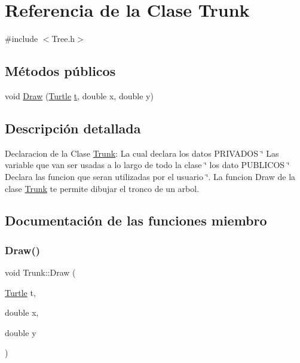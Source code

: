 \hypertarget{class_trunk}{}\section{Referencia de la Clase Trunk}
\label{class_trunk}


{\ttfamily \#include $<$Tree.\+h$>$}

\subsection*{Métodos públicos}
\begin{DoxyCompactItemize}
\item 
void \mbox{\hyperlink{class_trunk_a7317a58c0bce19c86cf9e90b5f0cbd93}{Draw}} (\mbox{\hyperlink{class_turtle}{Turtle}} \mbox{\hyperlink{_abstract_8cpp_a87833ae07d42f160626b6355cd9f8cf0}{t}}, double x, double y)
\end{DoxyCompactItemize}


\subsection{Descripción detallada}
Declaracion de la Clase \mbox{\hyperlink{class_trunk}{Trunk}}\+: La cual declara los datos P\+R\+I\+V\+A\+D\+OS \char`\"{} Las variable que van ser usadas a lo largo de todo la clase \char`\"{} los dato P\+U\+B\+L\+I\+C\+OS \char`\"{} Declara las funcion que seran utilizadas por el usuario \char`\"{}. La funcion Draw de la clase \mbox{\hyperlink{class_trunk}{Trunk}} te permite dibujar el tronco de un arbol. 

\subsection{Documentación de las funciones miembro}
\mbox{\label{class_trunk_a7317a58c0bce19c86cf9e90b5f0cbd93}} 
\subsubsection{\texorpdfstring{Draw()}{Draw()}}
{\footnotesize\ttfamily void Trunk\+::\+Draw (\begin{DoxyParamCaption}\item[{\mbox{\hyperlink{class_turtle}{Turtle}}}]{t,  }\item[{double}]{x,  }\item[{double}]{y }\end{DoxyParamCaption})\hspace{0.3cm}{\ttfamily [inline]}}

